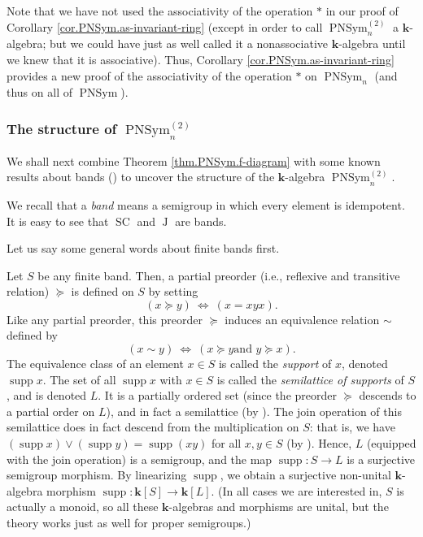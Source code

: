 \documentclass[numbers=enddot,12pt,final,onecolumn,notitlepage]{scrartcl}%
\theoremstyle{definition}
\newenvironment{fineprint}{\begin{small}}{\end{small}}
\begin{document}
\begin{fineprint}
Note that we have not used the associativity of the operation $\ast$ in our
proof of Corollary \ref{cor.PNSym.as-invariant-ring} (except in order to call
$\operatorname*{PNSym}\nolimits_{n}^{\left(  2\right)  }$ a $\mathbf{k}%
$-algebra; but we could have just as well called it a nonassociative
$\mathbf{k}$-algebra until we knew that it is associative). Thus, Corollary
\ref{cor.PNSym.as-invariant-ring} provides a new proof of the associativity of
the operation $\ast$ on $\operatorname*{PNSym}\nolimits_{n}$ (and thus on all
of $\operatorname*{PNSym}$).
\end{fineprint}

\subsubsection{The structure of $\operatorname*{PNSym}\nolimits_{n}^{\left(
2\right)  }$}

We shall next combine Theorem \ref{thm.PNSym.f-diagram} with some known
results about bands (\cite[Appendices A and B]{Brown04}) to uncover the
structure of the $\mathbf{k}$-algebra $\operatorname*{PNSym}\nolimits_{n}%
^{\left(  2\right)  }$.

We recall that a \emph{band} means a semigroup in which every element is
idempotent. It is easy to see that $\operatorname*{SC}$ and $\operatorname*{J}%
$ are bands.

Let us say some general words about finite bands first.

Let $S$ be any finite band. Then, a partial preorder (i.e., reflexive and
transitive relation) $\succcurlyeq$ is defined on $S$ by setting%
\[
\left(  x\succcurlyeq y\right)  \ \Longleftrightarrow\ \left(  x=xyx\right)
.
\]
Like any partial preorder, this preorder $\succcurlyeq$ induces an equivalence
relation $\sim$ defined by%
\[
\left(  x\sim y\right)  \ \Longleftrightarrow\ \left(  x\succcurlyeq y\text{
and }y\succcurlyeq x\right)  .
\]
The equivalence class of an element $x\in S$ is called the \emph{support} of
$x$, denoted $\operatorname*{supp}x$. The set of all $\operatorname*{supp}x$
with $x\in S$ is called the \emph{semilattice of supports} of $S$, and is
denoted $L$. It is a partially ordered set (since the preorder $\succcurlyeq$
descends to a partial order on $L$), and in fact a semilattice (by
\cite[Theorem A.11]{Brown04}). The join operation of this semilattice does in
fact descend from the multiplication on $S$: that is, we have $\left(
\operatorname*{supp}x\right)  \vee\left(  \operatorname*{supp}y\right)
=\operatorname*{supp}\left(  xy\right)  $ for all $x,y\in S$ (by
\cite[(A.3)]{Brown04}). Hence, $L$ (equipped with the join operation) is a
semigroup, and the map $\operatorname*{supp}:S\rightarrow L$ is a surjective
semigroup morphism. By linearizing $\operatorname*{supp}$, we obtain a
surjective non-unital $\mathbf{k}$-algebra morphism $\operatorname*{supp}%
:\mathbf{k}\left[  S\right]  \rightarrow\mathbf{k}\left[  L\right]  $. (In all
cases we are interested in, $S$ is actually a monoid, so all these
$\mathbf{k}$-algebras and morphisms are unital, but the theory works just as
well for proper semigroups.)
\end{document}
